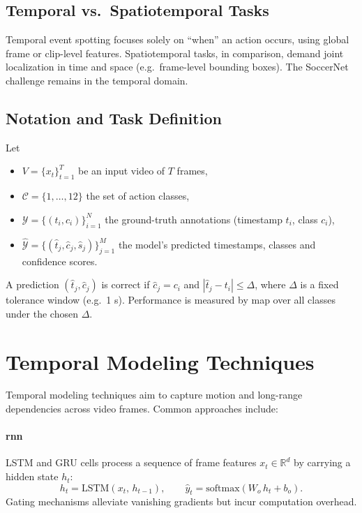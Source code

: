 \subsection{Temporal vs.\ Spatiotemporal Tasks}
Temporal event spotting focuses solely on “when” an action occurs, using global frame or clip-level features. Spatiotemporal tasks, in comparison, demand joint localization in time and space (e.g.\ frame-level bounding boxes). The SoccerNet challenge remains in the temporal domain.

\subsection{Notation and Task Definition}
Let
\begin{itemize}
  \item $V=\{x_t\}_{t=1}^T$ be an input video of $T$ frames,
  \item $\mathcal{C}=\{1,\dots,12\}$ the set of action classes,
  \item $\mathcal{Y}=\{(t_i,c_i)\}_{i=1}^N$ the ground-truth annotations (timestamp $t_i$, class $c_i$),
  \item $\hat{\mathcal{Y}}=\{(\hat t_j,\hat c_j,\hat s_j)\}_{j=1}^M$ the model's predicted timestamps, classes and confidence scores.
\end{itemize}
A prediction $(\hat t_j,\hat c_j)$ is correct if $\hat c_j=c_i$ and $|\hat t_j - t_i|\le\Delta$, where $\Delta$ is a fixed tolerance window (e.g.\ 1 s). Performance is measured by \acrfull{map} over all classes under the chosen $\Delta$.
\section{Temporal Modeling Techniques}
\label{sec:temporal_models}

Temporal modeling techniques aim to capture motion and long-range dependencies across video frames. Common approaches include: 

\paragraph{\acrfull{rnn}}  
LSTM and GRU cells process a sequence of frame features \(x_t\in\mathbb{R}^d\) by carrying a hidden state \(h_t\):
\[
h_t = \mathrm{LSTM}(x_t,\,h_{t-1}), 
\qquad
\hat y_t = \mathrm{softmax}(W_o\,h_t + b_o).
\]
Gating mechanisms alleviate vanishing gradients but incur computation overhead.

